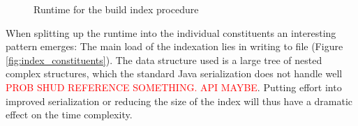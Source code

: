 \documentclass[thesis.tex]{subfiles}
\begin{document}
\begin{figure}[!ht]
    \caption{Runtime for the build index procedure}
    \label{fig:build_index}
\end{figure}
\par\noindent
When splitting up the runtime into the individual constituents an interesting pattern emerges: The main load of the indexation lies in writing to file (Figure \ref{fig:index_constituents}). The data structure used is a large tree of nested complex structures, which the standard Java serialization does not handle well \textcolor{red}{PROB SHUD REFERENCE SOMETHING. API MAYBE}. Putting effort into improved serialization or reducing the size of the index will thus have a dramatic effect on the time complexity.
\end{document}
